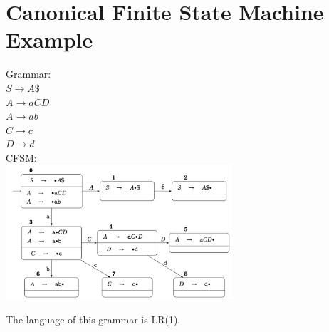 
\section{Canonical Finite State Machine Example}
Grammar:\\
$S \rightarrow A\$$\\
$A \rightarrow aCD$\\
$A \rightarrow ab$\\
$C \rightarrow c$\\
$D \rightarrow d$\\

CFSM:\\
\includegraphics[height=5cm]{./images/Screenshot 2024-08-29 at 10.23.12.png}

The language of this grammar is LR(1).